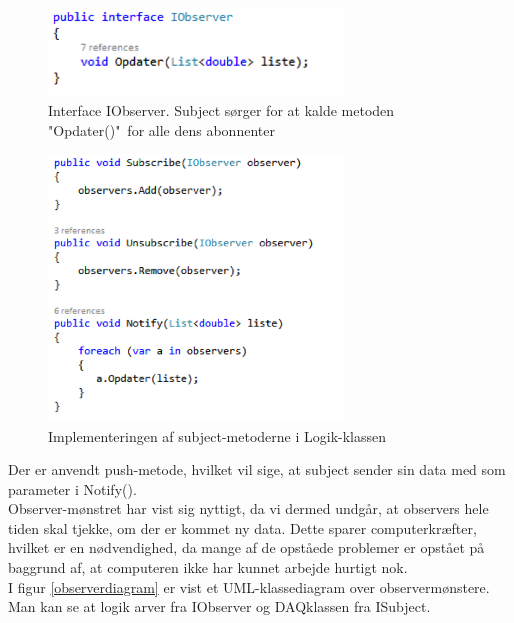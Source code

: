 \begin{figure}[H]
	\centering
	\includegraphics[width=0.7\textwidth]{Figurer/SoftwareImplementering/observer2}
	\caption{Interface IObserver. Subject sørger for at kalde metoden "Opdater()"\ for alle dens abonnenter}
	\label{observer2}
\end{figure}

\begin{figure}[H]
	\centering
	\includegraphics[width=0.7\textwidth]{Figurer/SoftwareImplementering/observer3}
	\caption{Implementeringen af subject-metoderne i Logik-klassen}
	\label{observer3}
\end{figure}
Der er anvendt push-metode, hvilket vil sige, at subject sender sin data med som parameter i Notify().\\
Observer-mønstret har vist sig nyttigt, da vi dermed undgår, at observers hele tiden skal tjekke, om der er kommet ny data. Dette sparer computerkræfter, hvilket er en nødvendighed, da mange af de opståede problemer er opstået på baggrund af, at computeren ikke har kunnet arbejde hurtigt nok.\\
I figur \ref{observerdiagram} er vist et UML-klassediagram over observermønstere. Man kan se at logik arver fra IObserver og DAQklassen fra ISubject.

